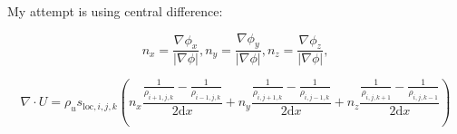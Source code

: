 \documentclass[12pt]{report}
\begin{document}
My attempt is using central difference:

\begin{equation}
  n_x = \frac{\nabla \phi_x}{\lvert \nabla \phi \rvert}, 
  n_y = \frac{\nabla \phi_y}{\lvert \nabla \phi \rvert}, 
  n_z = \frac{\nabla \phi_z}{\lvert \nabla \phi \rvert},  
\end{equation}


\begin{equation}
  \nabla \cdot U = \rho_u s_{\text{loc},i,j,k} \left(n_x \frac{\frac{1}{\rho_{i+1,j,k}} - \frac{1}{\rho_{i-1,j,k}}}{2\text{d}x}
  + n_y \frac{\frac{1}{\rho_{i,j+1,k}} - \frac{1}{\rho_{i,j-1,k}}}{2\text{d}x} + n_z \frac{\frac{1}{\rho_{i,j,k+1}} - \frac{1}{\rho_{i,j,k-1}}}{2\text{d}x} \right)
\end{equation}
     
\end{document}
